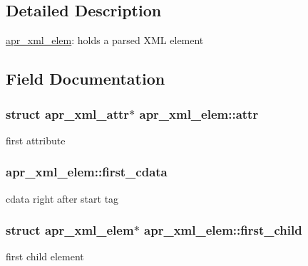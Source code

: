 \subsection{Detailed Description}
\hyperlink{structapr__xml__elem}{apr\+\_\+xml\+\_\+elem}\+: holds a parsed X\+ML element 

\subsection{Field Documentation}
\subsubsection[{\texorpdfstring{attr}{attr}}]{\setlength{\rightskip}{0pt plus 5cm}struct {\bf apr\+\_\+xml\+\_\+attr}$\ast$ apr\+\_\+xml\+\_\+elem\+::attr}\hypertarget{structapr__xml__elem_aa9c71585c0b2a32269852047aebdd61c}{}\label{structapr__xml__elem_aa9c71585c0b2a32269852047aebdd61c}
first attribute 
\subsubsection[{\texorpdfstring{first\+\_\+cdata}{first_cdata}}]{ apr\+\_\+xml\+\_\+elem\+::first\+\_\+cdata}\hypertarget{structapr__xml__elem_a732e8acd00e43330674fde57ef87163f}{}\label{structapr__xml__elem_a732e8acd00e43330674fde57ef87163f}
cdata right after start tag 
\subsubsection[{\texorpdfstring{first\+\_\+child}{first_child}}]{\setlength{\rightskip}{0pt plus 5cm}struct {\bf apr\+\_\+xml\+\_\+elem}$\ast$ apr\+\_\+xml\+\_\+elem\+::first\+\_\+child}\hypertarget{structapr__xml__elem_a620a28337f36592d4cb1f6dd3d2e97e0}{}\label{structapr__xml__elem_a620a28337f36592d4cb1f6dd3d2e97e0}
first child element 
